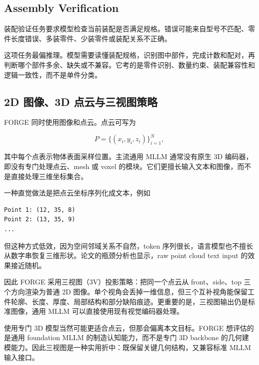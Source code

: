 \subsection{Assembly Verification}

装配验证任务要求模型检查当前装配是否满足规格。错误可能来自型号不匹配、零件长度错误、多装零件、少装零件或装配关系不正确。

这项任务最偏推理。模型需要读懂装配规格，识别图中部件，完成计数和配对，再判断哪个部件多余、缺失或不兼容。它考的是零件识别、数量约束、装配兼容性和逻辑一致性，而不是单件分类。

\subsection{2D 图像、3D 点云与三视图策略}

FORGE 同时使用图像和点云。点云可写为

\begin{equation}
    P = \{(x_i,y_i,z_i)\}_{i=1}^{N},
\end{equation}

其中每个点表示物体表面采样位置。主流通用 MLLM 通常没有原生 3D 编码器，即没有专门处理点云、mesh 或 voxel 的模块。它们更擅长输入文本和图像，而不是直接处理三维坐标集合。

一种直觉做法是把点云坐标序列化成文本，例如

\begin{verbatim}
Point 1: (12, 35, 8)
Point 2: (13, 35, 9)
...
\end{verbatim}

但这种方式低效，因为空间邻域关系不自然，token 序列很长，语言模型也不擅长从数字串恢复三维形状。论文的瓶颈分析也显示，raw point cloud text input 的效果接近随机。

因此 FORGE 采用三视图（3V）投影策略：把同一个点云从 front、side、top 三个方向渲染为普通 2D 图像。单个视角会丢掉一维信息，但三个互补视角能保留工件轮廓、长度、厚度、局部结构和部分缺陷痕迹。更重要的是，三视图输出仍是标准图像，通用 MLLM 可以直接使用现有视觉编码器处理。

使用专门 3D 模型当然可能更适合点云，但那会偏离本文目标。FORGE 想评估的是通用 foundation MLLM 的制造认知能力，而不是专门 3D backbone 的几何建模能力。因此三视图是一种实用折中：既保留关键几何结构，又兼容标准 MLLM 输入接口。
